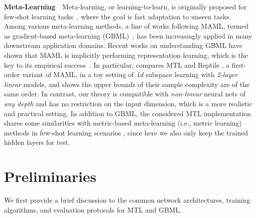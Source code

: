 \documentclass{article}
\begin{document}
\textbf{Meta-Learning}~~Meta-learning, or learning-to-learn, is originally proposed for few-shot learning tasks~\cite{learningtolearn,baxter1998theoretical}, where the goal is fast adaptation to unseen tasks. Among various meta-learning methods, a line of works following MAML, termed as gradient-based meta-learning (GBML)~\citep{maml,imaml}, has been increasingly applied in many downstream application domains. Recent works on understanding GBML have shown that MAML is implicitly performing representation learning, which is the key to its empirical success~\citep{raghu2019rapid}. In particular, \citet{saunshi2020sample} compares MTL and Reptile \cite{reptile}, a first-order variant of MAML, in a toy setting of \textit{1d} subspace learning with \textit{2-layer} \textit{linear} models, and shows the upper bounds of their sample complexity are of the same order. In contrast, our theory is compatible with \textit{non-linear} neural nets of \textit{any depth} and has no restriction on the input dimension, which is a more realistic and practical setting. In addition to GBML, the considered MTL implementation shares some similarities with metric-based meta-learning (i.e., metric learning) methods in few-shot learning scenarios \citep{snell2017prototypical,matching-net}, since here we also only keep the trained hidden layers for test.


\section{Preliminaries}\label{sec:prelim}
We first provide a brief discussion to the common network architectures, training algorithms, and evaluation protocols for MTL and GBML.
\end{document}

